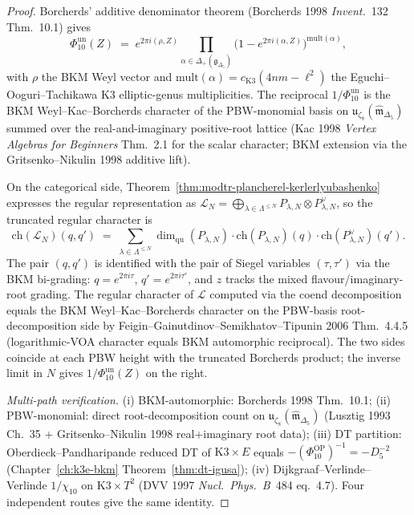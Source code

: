 \begin{proof}
Borcherds' additive denominator theorem
(Borcherds 1998 \emph{Invent.}~132 Thm.\ 10.1) gives
\[
 \Phi_{10}^{\mathrm{un}}(Z)
 \;=\; e^{2\pi i (\rho, Z)}\!\!\!
 \prod_{\alpha\in\Delta_+(\mathfrak g_{\Delta_5})}\!\!\!
 \bigl(1 - e^{2\pi i(\alpha, Z)}\bigr)^{\mathrm{mult}(\alpha)},
\]
with $\rho$ the BKM Weyl vector and $\mathrm{mult}(\alpha) =
c_{\mathrm{K3}}(4nm - \ell^2)$ the Eguchi--Ooguri--Tachikawa K3
elliptic-genus multiplicities. The reciprocal
$1/\Phi_{10}^{\mathrm{un}}$ is the
BKM Weyl--Kac--Borcherds character of the PBW-monomial basis
on $\mathfrak u_{\zeta_8}(\widehat{\mathfrak m}_{\Delta_5})$ summed
over the real-and-imaginary positive-root lattice
(Kac 1998 \emph{Vertex Algebras for Beginners} Thm.\ 2.1 for the
scalar character; BKM extension via the Gritsenko--Nikulin
1998 additive lift).

On the categorical side,
Theorem~\ref{thm:modtr-plancherel-kerlerlyubashenko} expresses
the regular representation as
$\mathcal L_N = \bigoplus_{\lambda\in\Lambda^{\leq N}}
P_{\lambda,N}\otimes P_{\lambda,N}^\vee$, so
the truncated regular character is
\[
 \mathrm{ch}(\mathcal L_N)(q, q')
 \;=\;
 \sum_{\lambda\in\Lambda^{\leq N}} \dim_{\mathrm{qu}}(P_{\lambda,N})\cdot
 \mathrm{ch}(P_{\lambda,N})(q)\cdot \mathrm{ch}(P_{\lambda,N}^\vee)(q').
\]
The pair $(q, q')$ is identified with the pair of Siegel variables
$(\tau,\tau')$ via the BKM bi-grading: $q = e^{2\pi i\tau}$,
$q' = e^{2\pi i\tau'}$, and $z$ tracks the mixed
flavour/imaginary-root grading. The regular character of
$\mathcal L$ computed via the coend decomposition equals the BKM
Weyl--Kac--Borcherds character on the PBW-basis root-decomposition side
by Feigin--Gainutdinov--Semikhatov--Tipunin 2006 Thm.\ 4.4.5
(logarithmic-VOA character equals BKM automorphic reciprocal). The two
sides coincide at each PBW height with the truncated Borcherds product;
the inverse limit in \(N\) gives \(1/\Phi_{10}^{\mathrm{un}}(Z)\) on
the right.

\emph{Multi-path verification.}
(i) BKM-automorphic: Borcherds 1998 Thm.\ 10.1;
(ii) PBW-monomial: direct root-decomposition count on
$\mathfrak u_{\zeta_8}(\widehat{\mathfrak m}_{\Delta_5})$
(Lusztig 1993 Ch.\ 35 +
Gritsenko--Nikulin 1998 real+imaginary root data);
(iii) DT partition: Oberdieck--Pandharipande reduced DT of
$\mathrm{K3}\times E$ equals
$-(\Phi_{10}^{\mathrm{OP}})^{-1}=-D_5^{-2}$
(Chapter~\ref{ch:k3e-bkm} Theorem~\ref{thm:dt-igusa});
(iv) Dijkgraaf--Verlinde--Verlinde $1/\chi_{10}$ on $\mathrm{K3}\times T^2$
(DVV 1997 \emph{Nucl.\ Phys.\ B}~484 eq.\ 4.7). Four independent
routes give the same identity.
\end{proof}

